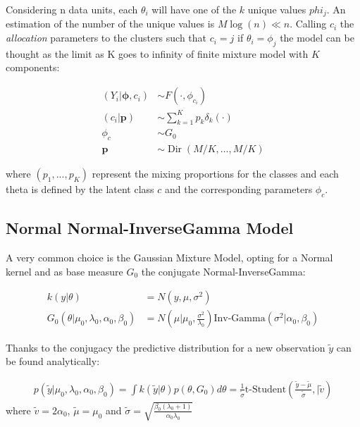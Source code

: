 Considering n data units, each $\theta_i$ will have one of the $k$ unique values $phi_j$. An estimation of the number of the unique values is $M\log(n) \ll n$. Calling  $c_i$ the \textit{allocation} parameters to the clusters such that $c_i = j$ if $\theta_i = \phi_j$ the model can be thought as the limit as K goes to infinity of
finite mixture model with $K$ components:

\begin{align*}
            	(Y_{i}|\mathbf{\phi},c_{i})&\sim F(\cdot,\phi_{c_{i}}) \\
            	(c_{i}|\mathit{\mathbf{p}})&\sim \sum_{k=1}^K\mathit{p_k} \delta_k(\cdot) \\
            	\phi_{c} & \sim G_{0} \\
            	\mathbf{p} &\sim \operatorname{Dir}(M/K,\dots,M/K)
\end{align*}
        

where $(p_1,...,p_K)$ represent the mixing proportions for the classes and each theta is defined by the latent class $c$ and the corresponding parameters $\phi_c$.


\subsection{Normal Normal-InverseGamma Model}
A very common choice is the Gaussian Mixture Model, opting for a Normal kernel and as base measure $G_0$ the conjugate Normal-InverseGamma:

\begin{align*}
            	k(y|\theta)&=N(y, \mu ,\sigma^2)  \\
            	G_0(\theta|\mu_0,\lambda_0, \alpha_0, \beta_0)&=N\left(\mu | \mu_0 ,\frac{\sigma^2} {\lambda_0}\right)\text{Inv-Gamma}(\sigma^2|\alpha_0, \beta_0 )
\end{align*}

Thanks to the conjugacy the predictive distribution for a new observation $\widetilde{y}$ can be found analytically:

\begin{align}
      p(\widetilde{y}|\mu_0,\lambda_0, \alpha_0, \beta_0)= \int k(\widetilde{y}|\theta)p(\theta, G_0)d\theta= \frac{1}{\widetilde{\sigma}} \text{t-Student}\left(\frac{\widetilde{y}-\widetilde{\mu}}{\widetilde{\sigma}} ,|\widetilde{v}\right)        	
\end{align}
where $\widetilde{v}=2 \alpha_0$, $\widetilde{\mu}=\mu_0$ and $\widetilde{\sigma}= \sqrt{\frac{\beta_0(\lambda_0+1)}{\alpha_0 \lambda_0}} $

